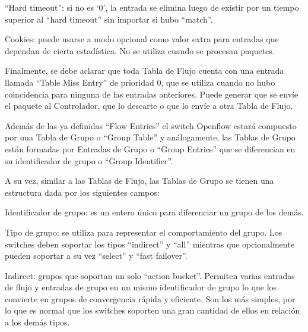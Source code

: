 \documentclass[12pt,a4paper,oneside]{book}
\begin{document}
“Hard timeout”: si no es ‘0’, la entrada se elimina luego de existir por un tiempo superior al “hard timeout” sin importar si hubo “match”.

\vspace{0.5cm}

Cookies: puede usarse a modo opcional como valor extra para entradas que dependan de cierta estadística. No se utiliza cuando se procesan paquetes.

\vspace{0.5cm}
	
Finalmente, se debe aclarar que toda Tabla de Flujo cuenta con una entrada llamada “Table Miss Entry” de prioridad 0, que se utiliza cuando no hubo coincidencia para ninguna de las entradas anteriores. Puede generar que se envíe el paquete al Controlador, que lo descarte o que lo envíe a otra Tabla de Flujo.

\vspace{0.5cm}

Además de las ya definidas “Flow Entries” el switch Openflow estará compuesto por una Tabla de Grupo o “Group Table” y análogamente, las Tablas de Grupo están formadas por Entradas de Grupo o “Group Entries” que se diferencian en su identificador de grupo o “Group Identifier”.

\vspace{0.5cm}

A su vez, similar a las Tablas de Flujo, las Tablas de Grupo se tienen una estructura dada por los siguientes campos:

\vspace{0.5cm}

Identificador de grupo: es un entero único para diferenciar un grupo de los demás.

\vspace{0.5cm}

Tipo de grupo: se utiliza para representar el comportamiento del grupo. Los switches deben soportar los tipos “indirect” y “all” mientras que opcionalmente pueden soportar a su vez “select” y “fast failover”.

\vspace{0.5cm}

Indirect: grupos que soportan un solo “action bucket”. Permiten varias entradas de flujo y entradas de grupo en un mismo identificador de grupo lo que los convierte en grupos de convergencia rápida y  eficiente. Son los más simples, por lo que es normal que los switches soporten una gran cantidad de ellos en relación a los demás tipos.
\end{document}
